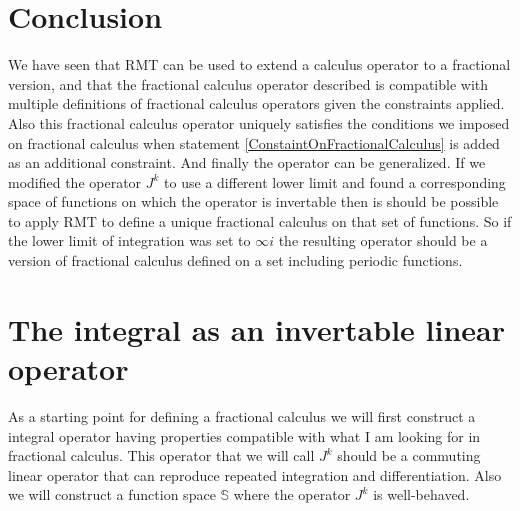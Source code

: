 \documentclass[%
 onecolumn,
 amsmath, amssymb, aps, pra, 10pt
]{revtex4-2}
\begin{document}
\section{Conclusion}
We have seen that RMT can be used to extend a calculus operator to a fractional version, and that the fractional calculus operator described is compatible with multiple definitions of fractional calculus operators given the constraints applied. Also this fractional calculus operator uniquely satisfies the conditions we imposed on fractional calculus when statement \eqref{ConstaintOnFractionalCalculus} is added as an additional constraint. And finally the operator can be generalized. If we modified the operator $J^k$ to use a different lower limit and found a corresponding space of functions on which the operator is invertable then is should be possible to apply RMT to define a unique fractional calculus on that set of functions. So if the lower limit of integration was set to $\infty i$ the resulting operator should be a version of fractional calculus defined on a set including periodic functions.

\clearpage

\appendix*
\section{The integral as an invertable linear operator}
As a starting point for defining a fractional calculus we will first construct a integral operator having properties compatible with what I am looking for in fractional calculus. This operator that we will call $J^k$ should be a commuting linear operator that can reproduce repeated integration and differentiation. Also we will construct a function space $\mathbb{S}$ where the operator $J^k$ is well-behaved.
\end{document}
